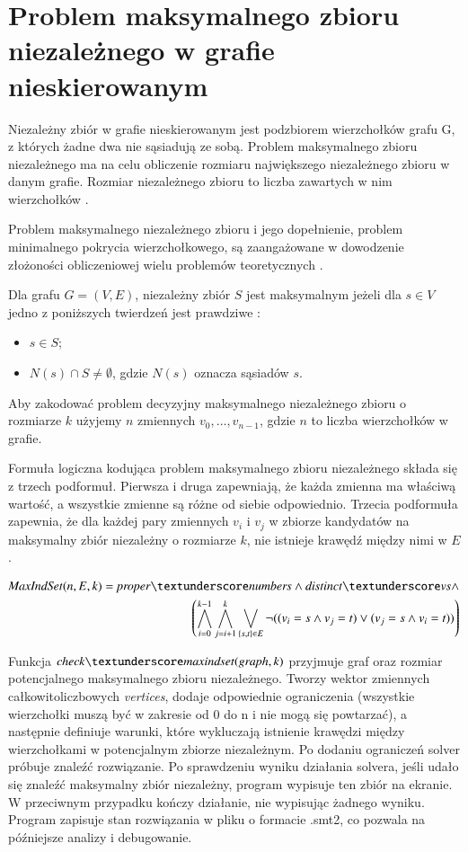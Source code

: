 \section{Problem maksymalnego zbioru niezależnego w grafie nieskierowanym}
Niezależny zbiór w grafie nieskierowanym jest podzbiorem wierzchołków grafu G, z których żadne dwa nie sąsiadują ze sobą. Problem maksymalnego zbioru niezależnego ma na celu obliczenie rozmiaru największego niezależnego zbioru w danym grafie. Rozmiar niezależnego zbioru to liczba zawartych w nim wierzchołków \cite{Korshunov1974}.

Problem maksymalnego niezależnego zbioru i jego dopełnienie, problem minimalnego pokrycia wierzchołkowego, są zaangażowane w dowodzenie złożoności obliczeniowej wielu problemów teoretycznych \cite{Skiena20}.

Dla grafu $G = (V, E)$, niezależny zbiór \(S\) jest maksymalnym jeżeli dla $s \in V$ jedno z poniższych twierdzeń jest prawdziwe \cite{maxIndSetDef}:

\begin{itemize}
	\item $s \in S$;
	\item $N(s) \cap S \neq \emptyset$, gdzie \(N(s)\) oznacza sąsiadów \(s\).
\end{itemize}

Aby zakodować problem decyzyjny maksymalnego niezależnego zbioru o rozmiarze $k$ użyjemy $n$ zmiennych $v_0,\ldots,v_{n-1}$, gdzie $n$ to liczba wierzchołków w grafie.

Formuła logiczna kodująca problem maksymalnego zbioru niezależnego składa się z trzech podformuł. Pierwsza i druga zapewniają, że każda zmienna ma właściwą wartość, a wszystkie zmienne są różne od siebie odpowiednio. Trzecia podformuła zapewnia, że dla każdej pary zmiennych \(v_i\) i \(v_j\) w zbiorze kandydatów na maksymalny zbiór niezależny o rozmiarze \(k\), nie istnieje krawędź między nimi w \(E\).

\begin{align*}
	\MaxIndSet(n, E, k) = \propernumbers \land \distinctvs  \land \\
	\left( \bigwedge_{i=0}^{k-1} \bigwedge_{j=i+1}^{k} \bigvee_{\{s,t\} \in E} \lnot((v_i = s \land v_j = t) \lor (v_j = s \land v_i = t)) \right)	
\end{align*}

Funkcja $\checkmaxindset$ przyjmuje graf oraz rozmiar potencjalnego maksymalnego zbioru niezależnego. Tworzy wektor zmiennych całkowitoliczbowych \textit{vertices}, dodaje odpowiednie ograniczenia (wszystkie wierzchołki muszą być w zakresie od 0 do n i nie mogą się powtarzać), a następnie definiuje warunki, które wykluczają istnienie krawędzi między wierzchołkami w potencjalnym zbiorze niezależnym. Po dodaniu ograniczeń solver próbuje znaleźć rozwiązanie. Po sprawdzeniu wyniku działania solvera, jeśli udało się znaleźć maksymalny zbiór niezależny, program wypisuje ten zbiór na ekranie. W przeciwnym przypadku kończy działanie, nie wypisując żadnego wyniku. Program zapisuje stan rozwiązania w pliku o formacie .smt2, co pozwala na późniejsze analizy i debugowanie.

